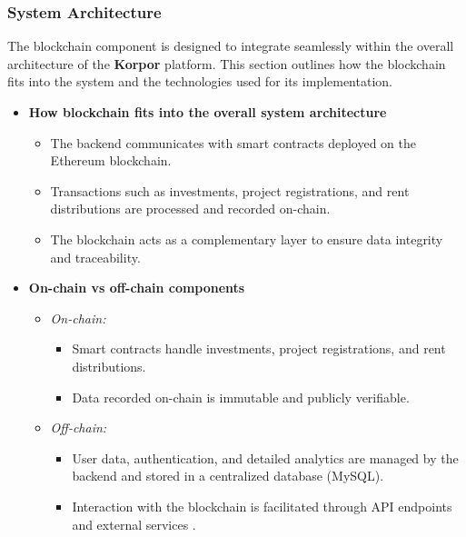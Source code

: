 \subsubsection{System Architecture}

The blockchain component is designed to integrate seamlessly within the overall architecture of the \textbf{\textcolor{primary}{Korpor}} platform. This section outlines how the blockchain fits into the system and the technologies used for its implementation.

\begin{itemize}
    \item \textbf{How blockchain fits into the overall system architecture}
    \begin{itemize}
        \item The backend communicates with smart contracts deployed on the Ethereum blockchain.
        \item Transactions such as investments, project registrations, and rent distributions are processed and recorded on-chain.
        \item The blockchain acts as a complementary layer to ensure data integrity and traceability.
    \end{itemize}

    \item \textbf{On-chain vs off-chain components}
    \begin{itemize}
        \item \textit{On-chain:}
        \begin{itemize}
            \item Smart contracts handle investments, project registrations, and rent distributions.
            \item Data recorded on-chain is immutable and publicly verifiable.
        \end{itemize}
        \item \textit{Off-chain:}
        \begin{itemize}
            \item User data, authentication, and detailed analytics are managed by the backend and stored in a centralized database (MySQL).
            \item Interaction with the blockchain is facilitated through API endpoints and external services \cite{Xu2019ArchitectingBlockchainApplications}.
        \end{itemize}
    \end{itemize}

\end{itemize}

